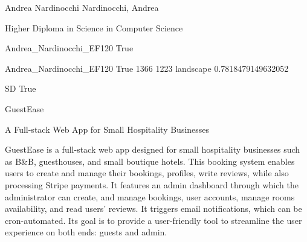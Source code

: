 
\begingroup{}\relax



\def\Key{Andrea_Nardinocchi_EF120}

{Andrea Nardinocchi}
{Nardinocchi, Andrea}

{Higher Diploma in Science in Computer Science}

{Andrea_Nardinocchi_EF120}
{True}

{Andrea_Nardinocchi_EF120}
{True}
{1366}
{1223}
{landscape}
{0.7818479149632052}

{SD}
{True}

{GuestEase}

{A Full-stack Web App for Small Hospitality Businesses}

{GuestEase is a full-stack web app designed for small hospitality businesses such as B\&B, guesthouses, and small boutique hotels. This booking system enables users to create and manage their bookings, profiles, write reviews, while also processing Stripe payments. It features an admin dashboard through which the administrator can create, and manage bookings, user accounts, manage rooms availability, and read users' reviews. It triggers email notifications, which can be cron-automated. Its goal is to provide a user-friendly tool to streamline the user experience on both ends: guests and admin.}


